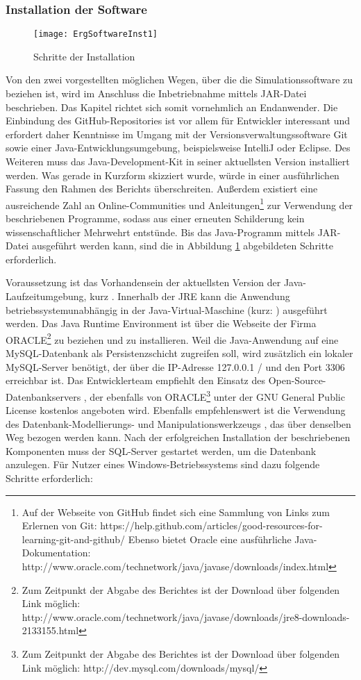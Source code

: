 \subsubsection{Installation der Software}\label{subsubsec:ErgSoftwareInst}
\begin{figure}[htb]
	\centering
	\texttt{[image: ErgSoftwareInst1]}
	\caption{Schritte der Installation}
	\label{fig:ErgSoftwareInst1}
\end{figure}
Von den zwei vorgestellten möglichen Wegen, über die die Simulationssoftware zu beziehen ist, wird im Anschluss die Inbetriebnahme mittels JAR-Datei beschrieben. Das Kapitel richtet sich somit vornehmlich an Endanwender.
Die Einbindung des GitHub-Repositories ist vor allem für Entwickler interessant und erfordert daher Kenntnisse im Umgang mit der Versionsverwaltungssoftware Git sowie einer Java-Entwicklungsumgebung, beispielsweise IntelliJ oder Eclipse. Des Weiteren muss das Java-Development-Kit in seiner aktuellsten Version installiert werden. Was gerade in Kurzform skizziert wurde, würde in einer ausführlichen Fassung den Rahmen des Berichts überschreiten. Außerdem existiert eine ausreichende Zahl an Online-Communities und Anleitungen\footnote{Auf der Webseite von GitHub findet sich eine Sammlung von Links zum Erlernen von Git: https://help.github.com/articles/good-resources-for-learning-git-and-github/
Ebenso bietet Oracle eine ausführliche Java-Dokumentation: http://www.oracle.com/technetwork/java/javase/downloads/index.html} zur Verwendung der beschriebenen Programme, sodass aus einer erneuten Schilderung kein wissenschaftlicher Mehrwehrt entstünde.
Bis das Java-Programm mittels JAR-Datei ausgeführt werden kann, sind die in Abbildung \ref{fig:ErgSoftwareInst1} abgebildeten Schritte erforderlich.

Voraussetzung ist das Vorhandensein der aktuellsten Version der Java-Laufzeitumgebung, kurz . Innerhalb der JRE kann die Anwendung betriebssystemunabhängig in der Java-Virtual-Maschine (kurz: ) ausgeführt werden. Das Java Runtime Environment ist über die Webseite der Firma ORACLE\footnote{Zum Zeitpunkt der Abgabe des Berichtes ist der Download über folgenden Link möglich: http://www.oracle.com/technetwork/java/javase/downloads/jre8-downloads-2133155.html} zu beziehen und zu installieren.
Weil die Java-Anwendung auf eine MySQL-Datenbank als Persistenzschicht zugreifen soll, wird zusätzlich ein lokaler MySQL-Server benötigt, der über die IP-Adresse 127.0.0.1 /  und den Port 3306 erreichbar ist. Das Entwicklerteam empfiehlt den Einsatz des Open-Source-Datenbankservers , der ebenfalls von ORACLE\footnote{Zum Zeitpunkt der Abgabe des Berichtes ist der Download über folgenden Link möglich: http://dev.mysql.com/downloads/mysql/} unter der GNU General Public License kostenlos angeboten wird. Ebenfalls empfehlenswert ist die Verwendung des Datenbank-Modellierungs- und Manipulationswerkzeugs , das über denselben Weg bezogen werden kann.
Nach der erfolgreichen Installation der beschriebenen Komponenten muss der SQL-Server gestartet werden, um die Datenbank anzulegen. Für Nutzer eines Windows-Betriebssystems sind dazu folgende Schritte erforderlich:


